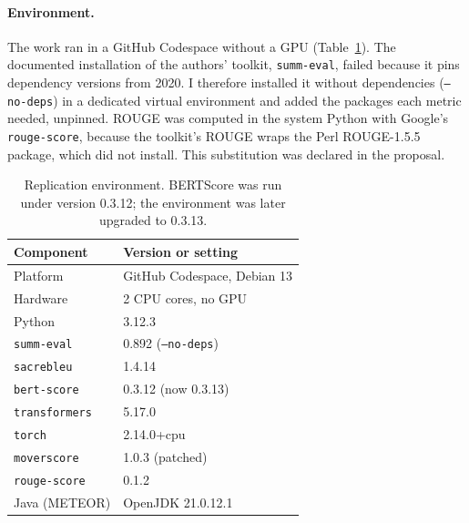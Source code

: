 \documentclass[11pt]{article}
\begin{document}
\paragraph{Environment.}
The work ran in a GitHub Codespace without a GPU (Table~\ref{tab:env}). The documented installation of the authors' toolkit, \texttt{summ-eval}, failed because it pins dependency versions from 2020. I therefore installed it without dependencies (\texttt{--no-deps}) in a dedicated virtual environment and added the packages each metric needed, unpinned. ROUGE was computed in the system Python with Google's \texttt{rouge-score}, because the toolkit's ROUGE wraps the Perl ROUGE-1.5.5 package, which did not install. This substitution was declared in the proposal.

\begin{table}[t]
\centering
\small
\begin{tabular}{@{}ll@{}}
\toprule
Component & Version or setting \\
\midrule
Platform & GitHub Codespace, Debian 13 \\
Hardware & 2 CPU cores, no GPU \\
Python & 3.12.3 \\
\texttt{summ-eval} & 0.892 (\texttt{--no-deps}) \\
\texttt{sacrebleu} & 1.4.14 \\
\texttt{bert-score} & 0.3.12 (now 0.3.13) \\
\texttt{transformers} & 5.17.0 \\
\texttt{torch} & 2.14.0+cpu \\
\texttt{moverscore} & 1.0.3 (patched) \\
\texttt{rouge-score} & 0.1.2 \\
Java (METEOR) & OpenJDK 21.0.12.1 \\
\bottomrule
\end{tabular}
\caption{Replication environment. BERTScore was run under version 0.3.12; the environment was later upgraded to 0.3.13.}
\label{tab:env}
\end{table}
\end{document}
